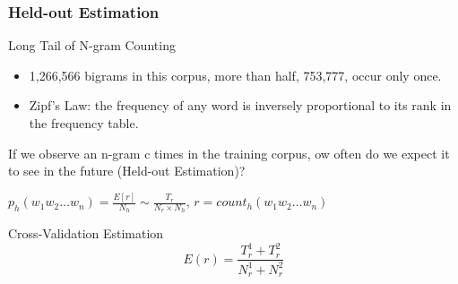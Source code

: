 \documentclass{beamer}
\begin{document}
\begin{frame}\frametitle{Held-out Estimation}

\begin{block}{Long Tail of N-gram Counting}
\begin{itemize}
\item 1,266,566 bigrams in this corpus, more than
half, 753,777, occur only once.
\item Zipf's Law:  the frequency of any word is inversely proportional to its rank in the frequency table. 
\end{itemize}

If we observe an n-gram
c times in the training corpus, ow often
do we expect it to see in the future (Held-out Estimation)?

$p_h(w_1w_2\ldots w_n) = \frac{E[r]}{N_h} \sim \frac{T_r}{N_r\times
  N_h}$,
$r = count_h(w_1w_2\ldots w_n)$
\end{block}

\begin{block}{Cross-Validation Estimation}
$$E(r) = \frac{T_r^1+T_r^2}{N_r^1+N_r^2}$$
\end{block}


\end{frame}
\end{document}
